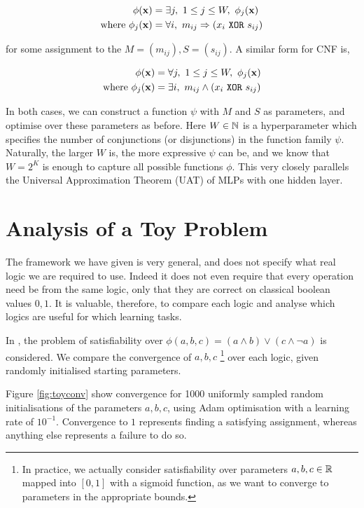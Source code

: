 $$
\begin{aligned}
\phi(\mathbf{x}) &= \exists j,\ 1 \leq j \leq W,\ \phi_j(\mathbf{x}) \\
\text{where } \phi_j(\mathbf{x}) &= \forall i,\ m_{ij} \Rightarrow (x_i \ \texttt{XOR}\  s_{ij})
\end{aligned}
$$

for some assignment to the $M = (m_{ij}), S = (s_{ij})$. A similar form for CNF is,

$$
\begin{aligned}
\phi(\mathbf{x}) &= \forall j,\ 1 \leq j \leq W,\ \phi_j(\mathbf{x}) \\
\text{where } \phi_j(\mathbf{x}) &= \exists i,\ m_{ij} \land (x_i \ \texttt{XOR}\  s_{ij})
\end{aligned}
$$

In both cases, we can construct a function $\psi$ with $M$ and $S$ as parameters, and optimise over these parameters as before. Here $W \in\mathbb{N}$ is a hyperparameter which specifies the number of conjunctions (or disjunctions) in the function family $\psi$. Naturally, the larger $W$ is, the more expressive $\psi$ can be, and we know that $W = 2^K$ is enough to capture all possible functions $\phi$. This very closely parallels the Universal Approximation Theorem (UAT) of MLPs with one hidden layer.

\section{Analysis of a Toy Problem}

The framework we have given is very general, and does not specify what real logic we are required to use. Indeed it does not even require that every operation need be from the same logic, only that they are correct on classical boolean values $0,1$. It is valuable, therefore, to compare each logic and analyse which logics are useful for which learning tasks.

In \cite{analyzefuzzy}, the problem of satisfiability over $\phi(a,b,c) = (a \land b) \lor (c \land \lnot a)$ is considered. We compare the convergence of $a, b, c$ \footnote{In practice, we actually consider satisfiability over parameters $a, b, c \in \mathbb{R}$ mapped into $[0,1]$ with a sigmoid function, as we want to converge to parameters in the appropriate bounds.} over each logic, given randomly initialised starting parameters.

Figure \ref{fig:toyconv} show convergence for 1000 uniformly sampled random initialisations of the parameters $a, b, c$, using Adam optimisation \cite{adam} with a learning rate of $10^{-1}$. Convergence to $1$ represents finding a satisfying assignment, whereas anything else represents a failure to do so.

